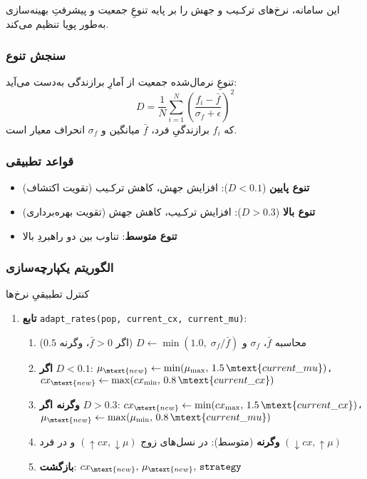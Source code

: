 این سامانه، نرخ‌های ترکـیب و جهش را بر پایه تنوعِ جمعیت و پیشرفتِ بهینه‌سازی به‌طور پویا تنظیم می‌کند.

\subsubsection{سنجش تنوع}

تنوعِ نرمال‌شده جمعیت از آمارِ برازندگی به‌دست می‌آید:
\begin{equation}\label{Eq.diversity_measure}
D = \frac{1}{N} \sum_{i=1}^{N} \left(\frac{f_i - \bar{f}}{\sigma_f + \epsilon}\right)^{\!2}
\end{equation}
که \(f_i\) برازندگیِ فرد، \(\bar{f}\) میانگین و \(\sigma_f\) انحراف معیار است.

\subsubsection{قواعد تطبیقی}

\begin{itemize}
\item \textbf{تنوع پایین} (\(D<0.1\)): افزایش جهش، کاهش ترکـیب (تقویت اکتشاف)
\item \textbf{تنوع بالا} (\(D>0.3\)): افزایش ترکـیب، کاهش جهش (تقویت بهره‌برداری)
\item \textbf{تنوع متوسط}: تناوب بین دو راهبردِ بالا
\end{itemize}

\subsubsection{الگوریتم یکپارچه‌سازی}

\begin{algorithm}
\caption{کنترل تطبیقیِ نرخ‌ها}
\begin{enumerate}
\item \textbf{تابع} \texttt{adapt\_rates(pop, current\_cx, current\_mu)}:
  \begin{enumerate}
  \item محاسبه \(\bar{f}\)، \(\sigma_f\) و \(D \leftarrow \min(1.0,\; \sigma_f/\bar{f})\) (اگر \(\bar{f}>0\)، وگرنه \(0.5\))
  \item \textbf{اگر} \(D<0.1\): \(\mu_{\mtext{new}} \leftarrow \min(\mu_{\max},\, 1.5\,\mtext{current\_mu})\)، \(cx_{\mtext{new}} \leftarrow \max(cx_{\min},\, 0.8\,\mtext{current\_cx})\)
  \item \textbf{وگرنه اگر} \(D>0.3\): \(cx_{\mtext{new}} \leftarrow \min(cx_{\max},\, 1.5\,\mtext{current\_cx})\)، \(\mu_{\mtext{new}} \leftarrow \max(\mu_{\min},\, 0.8\,\mtext{current\_mu})\)
  \item \textbf{وگرنه} (متوسط): در نسل‌های زوج \((\uparrow cx,\downarrow \mu)\) و در فرد \((\downarrow cx,\uparrow \mu)\)
  \item \textbf{بازگشت}: \(cx_{\mtext{new}},\, \mu_{\mtext{new}},\, \texttt{strategy}\)
  \end{enumerate}
\end{enumerate}
\end{algorithm}

